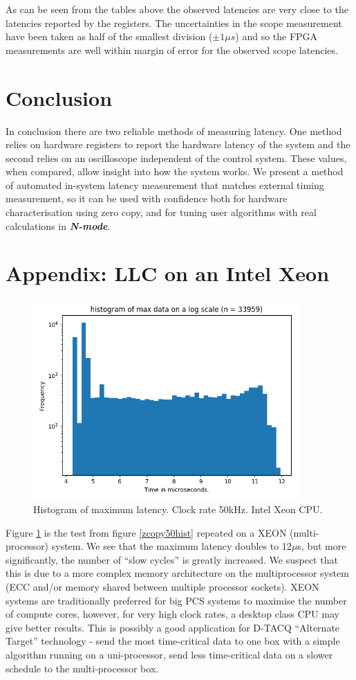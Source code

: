 \documentclass{article}
\begin{document}
As can be seen from the tables above the observed latencies are very close to the latencies reported by the registers.
The uncertainties in the scope measurement have been taken as half of the smallest division ($\pm 1 \mu s$) and so the FPGA measurements are well within margin of error for the observed scope latencies.

\section{Conclusion} \label{conc}
In conclusion there are two reliable methods of measuring latency.
One method relies on hardware registers to report the hardware latency of the system and the second relies on an oscilloscope independent of the control system.
These values, when compared, allow insight into how the system works.
We present a method of automated in-system latency measurement that matches external timing measurement, so it can be used with confidence both for hardware characterisation using zero copy, and for tuning user algorithms with real calculations in \textit{\textbf{N-mode}}.

\section{Appendix: LLC on an Intel Xeon} \label{xeon}

\begin{figure}[!htb]
	\centering
	\includegraphics[width=4.0in]{images/50kHz_xeon.png}
	\caption{Histogram of maximum latency. Clock rate 50kHz. Intel Xeon CPU.}
	\label{xeon50}
\end{figure}

Figure \ref{xeon50} is the test from figure \ref{zcopy50hist} repeated on a XEON (multi-processor) system.
We see that the maximum latency doubles to 12$\mu$s, but more significantly, the number of “slow cycles” is greatly increased.
We suspect that this is due to a more complex memory architecture on the multiprocessor system (ECC and/or memory shared between multiple processor sockets).
XEON systems are traditionally preferred for big PCS systems to maximise the number of compute cores, however, for very high clock rates, a desktop class CPU may give better results.
This is possibly a good application for \mbox{D-TACQ} “Alternate Target” technology - send the most time-critical data to one box with a simple algorithm running on a uni-processor, send less time-critical data on a slower schedule to the multi-processor box.
\end{document}
